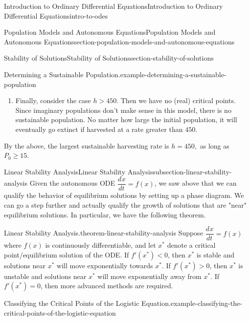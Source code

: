 \documentclass[oneside,10pt,]{book}
\newcommand{\terminology}[1]{\textbf{#1}}
\numberwithin{equation}{section}
\newcommand{\dv}[3][]{\dfrac{d^{#1} #2}{d #3^{#1}}}
\newcommand{\lt}{<}
\newcommand{\gt}{>}
\begin{document}
\begin{chapterptx}{Introduction to Ordinary Differential Equations}{}{Introduction to Ordinary Differential Equations}{}{}{intro-to-odes}
\begin{sectionptx}{Population Models and Autonomous Equations}{}{Population Models and Autonomous Equations}{}{}{section-population-models-and-autonomous-equations}
\begin{subsectionptx}{Stability of Solutions}{}{Stability of Solutions}{}{}{section-stability-of-solutions}
\begin{example}{Determining a Sustainable Population.}{example-determining-a-sustainable-population}
\begin{enumerate}
\begin{figure}
{
}
\end{figure}
\hypertarget{p-134}{}%
We interpret the phase diagram as follows: if \(P\) is less than \hypertarget{p-135}{}%
15,000%
 then the population will collapse to extinction. Otherwise, the population will stabilize at \(15,000\). This type of critical point is often called \terminology{semi-stable.}%
\item\hypertarget{li-13}{}\hypertarget{p-136}{}%
Finally, consider the case \(h \gt 450\). Then we have no (real) critical points. Since imaginary populations don't make sense in this model, there is no sustainable population. No matter how large the initial population, it will eventually go extinct if harvested at a rate greater than \(450\).%
\end{enumerate}
\hypertarget{p-137}{}%
By the above, the largest sustainable harvesting rate is \(h = 450,\) as long as \(P_{0}\geq 15\).%
\end{example}
\end{subsectionptx}
%
%
\typeout{************************************************}
\typeout{************************************************}
%
\begin{subsectionptx}{Linear Stability Analysis}{}{Linear Stability Analysis}{}{}{subsection-linear-stability-analysis}
\hypertarget{p-138}{}%
Given the autonomous ODE \(\dv{x}{t} = f(x)\), we saw above that we can qualify the behavior of equilibrium solutions by setting up a phase diagram. We can go a step further and actually qualify the growth of solutions that are "near" equilibrium solutions. In particular, we have the following theorem.%
\begin{theorem}{Linear Stability Analysis.}{}{theorem-linear-stability-analysis}%
\hypertarget{p-139}{}%
Suppose \(\dv{x}{t} = f(x)\) where \(f(x)\) is continuously differentiable, and let \(x^{*}\) denote a critical point\slash{}equilibrium solution of the ODE. If \(f'(x^{*}) \lt 0\), then \(x^{*}\) is stable and solutions near \(x^{*}\) will move exponentially towards \(x^{*}\). If \(f'(x^{*}) \gt 0\), then \(x^{*}\) is unstable and solutions near \(x^{*}\) will move exponentially away from \(x^{*}\). If \(f'(x^{*}) = 0\), then more advanced methods are required.%
\end{theorem}
\begin{example}{Classifying the Critical Points of the Logistic Equation.}{example-classifying-the-critical-points-of-the-logistic-equation}%

\end{example}
\end{subsectionptx}
\end{sectionptx}
\end{chapterptx}
\end{document}
